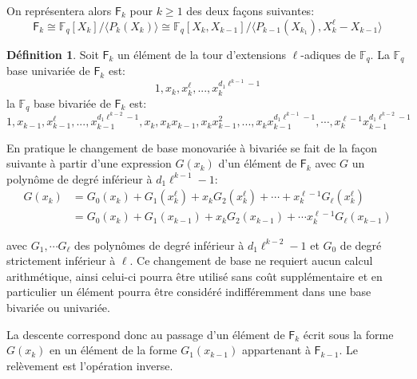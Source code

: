 \documentclass[10pt,a4paper]{book}
\theoremstyle{plain}
\theoremstyle{definition}
\theoremstyle{definition}
\theoremstyle{definition}
\theoremstyle{definition}
\theoremstyle{definition}
\newtheorem{defi}[thm]{Définition}
\theoremstyle{remark}
\theoremstyle{remark}
\theoremstyle{definition}
\begin{document}
On représentera alors $\mathsf{F}_k$ pour $k\geqslant1$ des deux façons suivantes:
\begin{equation*}
\mathsf{F}_k \cong \mathbb{F}_q[X_k]/\langle P_k(X_k) \rangle \cong \mathbb{F}_q[X_k,X_{k-1}]/\langle P_{k-1}(X_{k_1}), X_k^{\ell}-X_{k-1}  \rangle
\end{equation*}
  
\begin{defi}
Soit $\mathsf{F}_k$ un élément de la tour d'extensions $\ell$-adiques de $\mathbb{F}_q$.
La $\mathbb{F}_q$ base univariée de $\mathsf{F}_k$ est:
\begin{equation*}
1,x_k,x_k^{\ell},...,x_k^{d_1\ell^{k-1}-1}
\end{equation*}
la $\mathbb{F}_q$ base bivariée de $\mathsf{F}_k$ est:
\begin{equation*}
1,x_{k-1},x_{k-1}^{\ell},...,x_{k-1}^{d_1\ell^{k-2}-1},x_k,x_kx_{k-1},x_kx_{k-1}^2,...,x_kx_{k-1}^{d_1\ell^{k-1}-1}, \cdots, x_k^{\ell-1}x_{k-1}^{d_1\ell^{k-2}-1}
\end{equation*}
\end{defi}

En pratique le changement de base monovariée à bivariée se fait de la façon suivante à partir d'une expression $G(x_k)$ d'un élément de $\mathsf{F}_k$ avec $G$ un polynôme de degré inférieur à $d_1\ell^{k-1}-1$: 
\begin{equation*}
\begin{alignedat}{1}
 G(x_k) &= G_0(x_k)+ G_1(x_k^\ell)+x_kG_2(x_k^\ell)+ \cdots + x_k^{\ell-1} G_{\ell}(x_k^{\ell})\\
&= G_0(x_k)+G_1(x_{k-1})+x_kG_2(x_{k-1})+ \cdots x_k^{\ell-1}G_{\ell}(x_{k-1})
\end{alignedat}
\end{equation*}

avec $G_1, \cdots G_{\ell}$ des polynômes de degré inférieur à $d_1\ell^{k-2}-1$ et $G_0$ de degré strictement inférieur à $\ell$. Ce changement de base ne requiert aucun calcul arithmétique, ainsi celui-ci pourra être utilisé sans coût supplémentaire et en particulier un élément pourra être considéré indifféremment dans une base bivariée ou univariée. %

La descente correspond donc au passage d'un élément de $\mathsf{F}_k$ écrit sous la forme $G(x_k)$ en un élément de la forme $G_1(x_{k-1})$ appartenant à $\mathsf{F}_{k-1}$. Le relèvement est l'opération inverse.
\end{document}
